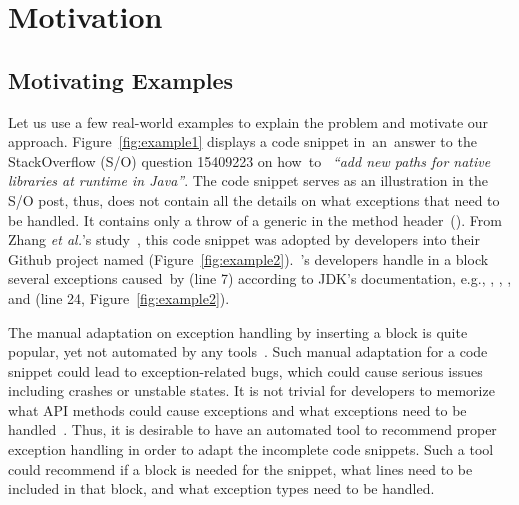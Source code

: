 \section{Motivation}
\label{motiv:sec}

\subsection{Motivating Examples}
\label{examples:sec}



Let us use a few real-world examples to explain the problem and
motivate our approach. Figure~\ref{fig:example1} displays a code
snippet in~an~answer to the StackOverflow (S/O) question 15409223 on
how~to~ {\em ``add new paths for native libraries at runtime in
  Java''}.  The code snippet serves as an illustration in the S/O
post, thus, does not contain all the details on what exceptions that
need to be handled. It contains only a throw of a generic
 in the method header~(). From
Zhang {\em et al.}'s study~\cite{zhang-icse19}, this code snippet was
adopted by developers into their Github project named 
(Figure~\ref{fig:example2}).~'s developers handle in a
 block several exceptions caused~by
 (line 7)
according to JDK's documentation, e.g.,
, ,
, and
 (line 24,
Figure~\ref{fig:example2}).

The manual adaptation on exception handling by inserting a
 block is quite popular, yet not automated by any
tools~\cite{zhang-icse19}. Such manual adaptation for a code snippet
could lead to exception-related bugs, which could cause serious issues
including crashes or unstable states. It is not trivial for developers
to memorize what API methods could cause exceptions and what
exceptions need to be handled~\cite{xrank-fse20}. Thus, it is
desirable to have an automated tool to recommend proper exception
handling in order to adapt the incomplete code snippets.  Such a tool
could recommend if a  block is needed for the snippet,
what lines need to be included in that block, and what exception types need
to be handled.


